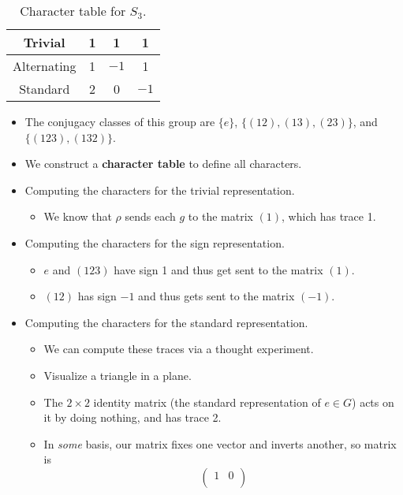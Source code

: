 \documentclass[../notes.tex]{subfiles}
\begin{document}
\begin{itemize}
\begin{enumerate}
\begin{table}[h!]
\begin{tabular}{c|c|c|c|}
                \hline
                Trivial & 1 & 1 & 1\\ \hline
                Alternating & 1 & $-1$ & 1\\ \hline
                Standard & 2 & 0 & $-1$\\ \hline
            \end{tabular}
            \caption{Character table for $S_3$.}
            \label{tab:charTableS3}
        \end{table}
        \begin{itemize}
            \item The conjugacy classes of this group are $\{e\}$, $\{(12),(13),(23)\}$, and $\{(123),(132)\}$.
            \item We construct a \textbf{character table} to define all characters.
            \item Computing the characters for the trivial representation.
            \begin{itemize}
                \item We know that $\rho$ sends each $g$ to the matrix $(1)$, which has trace 1.
            \end{itemize}
            \item Computing the characters for the sign representation.
            \begin{itemize}
                \item $e$ and $(123)$ have sign 1 and thus get sent to the matrix $(1)$.
                \item $(12)$ has sign $-1$ and thus gets sent to the matrix $(-1)$.
            \end{itemize}
            \item Computing the characters for the standard representation.
            \begin{itemize}
                \item We can compute these traces via a thought experiment.
                \item Visualize a triangle in a plane.
                \item The $2\times 2$ identity matrix (the standard representation of $e\in G$) acts on it by doing nothing, and has trace 2.
                \item In \emph{some} basis, our matrix fixes one vector and inverts another, so matrix is
                \begin{equation*}
                    \begin{pmatrix}
                        1 & 0\\

\end{pmatrix}
\end{equation*}
\end{itemize}
\end{itemize}
\end{enumerate}
\end{itemize}
\end{document}
